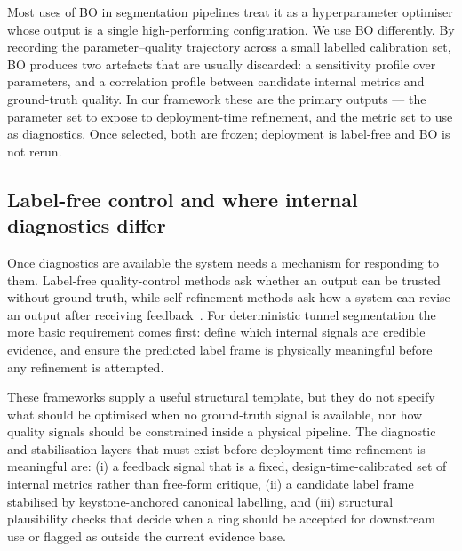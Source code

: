 \documentclass[a4paper,fleqn]{cas-dc}
\begin{document}
Most uses of BO in segmentation pipelines treat it as a hyperparameter optimiser whose output is a single high-performing configuration. We use BO differently. By recording the parameter--quality trajectory across a small labelled calibration set, BO produces two artefacts that are usually discarded: a sensitivity profile over parameters, and a correlation profile between candidate internal metrics and ground-truth quality. In our framework these are the primary outputs --- the parameter set to expose to deployment-time refinement, and the metric set to use as diagnostics. Once selected, both are frozen; deployment is label-free and BO is not rerun.

\subsection{Label-free control and where internal diagnostics differ}

Once diagnostics are available the system needs a mechanism for responding to them. Label-free quality-control methods ask whether an output can be trusted without ground truth, while self-refinement methods ask how a system can revise an output after receiving feedback~\cite{madaan2023selfrefine,shinn2023reflexion}. For deterministic tunnel segmentation the more basic requirement comes first: define which internal signals are credible evidence, and ensure the predicted label frame is physically meaningful before any refinement is attempted.

These frameworks supply a useful structural template, but they do not specify what should be optimised when no ground-truth signal is available, nor how quality signals should be constrained inside a physical pipeline. The diagnostic and stabilisation layers that must exist before deployment-time refinement is meaningful are: (i) a feedback signal that is a fixed, design-time-calibrated set of internal metrics rather than free-form critique, (ii) a candidate label frame stabilised by keystone-anchored canonical labelling, and (iii) structural plausibility checks that decide when a ring should be accepted for downstream use or flagged as outside the current evidence base.
\end{document}
